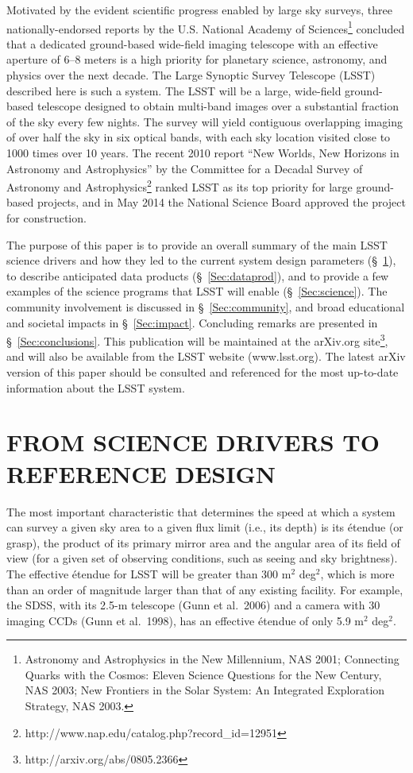 \documentclass{emulateapj}
\begin{document}
Motivated by the evident scientific progress enabled by large sky surveys,
three nationally-endorsed reports by the U.S. National Academy of Sciences\footnote{
  Astronomy and Astrophysics in the New Millennium, NAS 2001; 
  Connecting Quarks with the Cosmos: Eleven Science Questions for the New Century, NAS 2003; 
  New Frontiers in the Solar System: An Integrated Exploration Strategy, NAS 2003.   
}
concluded that a dedicated ground-based wide-field imaging telescope with an effective aperture 
of 6--8 meters is a high priority for planetary science, astronomy, and physics 
over the next decade. The Large Synoptic Survey Telescope (LSST) described here is 
such a system. The LSST will be a large, wide-field ground-based telescope 
designed to obtain multi-band images over a substantial fraction of the sky
every few nights. The survey will yield contiguous overlapping imaging of over
half the sky in six optical bands, with each sky location visited close to 1000 times over 
10 years. The recent 2010 report ``New Worlds, New Horizons in Astronomy and Astrophysics''
by the Committee for a Decadal Survey of Astronomy and 
Astrophysics\footnote{http://www.nap.edu/catalog.php?record\_id=12951}
ranked LSST as its top priority for large ground-based projects, and in May 2014 the National 
Science Board approved the project for construction. 

The purpose of this paper is to provide an overall summary of the main LSST
science drivers and how they led to the current system design parameters 
(\S~\ref{Sec:refdesign}), to describe anticipated data products (\S~\ref{Sec:dataprod}), 
and to provide a few examples of the science programs that LSST will enable 
(\S~\ref{Sec:science}). The community involvement is discussed in \S~\ref{Sec:community}, 
and broad educational and societal impacts in \S~\ref{Sec:impact}. Concluding 
remarks are presented in \S~\ref{Sec:conclusions}. This publication will be maintained 
at the arXiv.org site\footnote{http://arxiv.org/abs/0805.2366}, and will also
be available from the LSST website (www.lsst.org). The latest arXiv version of this paper 
should be consulted and referenced for the most up-to-date information about the 
LSST system.

\section{FROM SCIENCE DRIVERS TO REFERENCE DESIGN}
\label{Sec:refdesign}

The most important characteristic that determines the speed at which a system can 
survey a given sky area to a given flux limit (i.e., its depth) is its \'etendue
(or grasp), the product of its primary mirror area and the angular
area of its field of view (for a given set of observing conditions, such as
seeing and sky brightness). 
The effective \'etendue for LSST will be greater than 300 m$^2$ deg$^2$, which
is more than an order of magnitude larger than that of any existing facility.  
For example, the SDSS, with its 2.5-m telescope (Gunn et al.~2006) and a
camera with 30 imaging CCDs (Gunn et al.~1998), has an effective \'etendue of 
only 5.9 m$^2$ deg$^2$.
\end{document}
